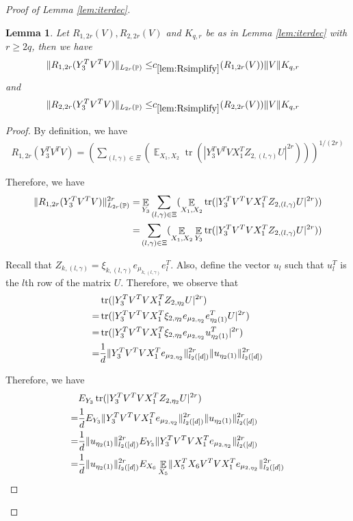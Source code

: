 \documentclass[11pt]{amsart}
\numberwithin{equation}{section}
\numberwithin{equation}{section}
\DeclareMathOperator{\E}{\mathbb{E}}
\DeclareMathOperator{\Pb}{\mathbb{P}}
\DeclareMathOperator*{\tr}{tr}
\DeclarePairedDelimiter{\norm}{\lVert}{\rVert}
\newtheorem{lemma}[theorem]{Lemma}
\begin{document}
\begin{proof}[Proof of Lemma \ref{lem:iterdec}]
\begin{lemma}\label{lem:Rsimplify}
Let $R_{1,2r}(V), R_{2,2r}(V)$ and $K_{q,r}$ be as in Lemma \ref{lem:iterdec} with $r \ge2q$, then we have
\begin{align*}
    \norm{R_{1,2r}(Y_3^TV^TV)}_{L_{2r}(\Pb)}  
    \le &c_{\ref{lem:Rsimplify}}(R_{1,2r}(V))\norm{V}K_{q,r}
\end{align*}
and
\begin{align*}
    \norm{R_{2,2r}(Y_3^TV^TV)}_{L_{2r}(\Pb)}  
    \le &c_{\ref{lem:Rsimplify}}(R_{2,2r}(V))\norm{V}K_{q,r}
\end{align*}
\end{lemma}

\begin{proof}
By definition, we have
\begin{align*}
    R_{1,2r}(Y_3^TV^TV)=(\sum\limits_{(l,\gamma) \in \Xi}(\E_{X_1,X_2} \tr(|Y_3^TV^TVX_1^TZ_{2,(l,\gamma)}U|^{2r})))^{1/(2r)}
\end{align*}

Therefore, we have
\begin{align*}
    \norm{R_{1,2r}(Y_3^TV^TV)}_{L_{2r}(\Pb)}^{2r}  
    = & \E_{Y_3} \sum\limits_{(l,\gamma) \in \Xi}(\E_{X_1,X_2} \tr(|Y_3^TV^TVX_1^TZ_{2,(l,\gamma)}U|^{2r}))
    \\= &  \sum\limits_{(l,\gamma) \in \Xi}(\E_{X_1,X_2} \E_{Y_3}\tr(|Y_3^TV^TVX_1^TZ_{2,(l,\gamma)}U|^{2r}))
\end{align*}





Recall that $Z_{k,(l,\gamma)}=\xi_{k,(l,\gamma)}e_{\mu_{k,(l,\gamma)}}e_l^T$. Also, define the vector $u_l$ such that $u_l^T$ is the $l$th row of the matrix $U$. Therefore, we observe that
\begin{align*}
    &\tr(|Y_3^TV^TVX_1^TZ_{2,\eta_2}U|^{2r})
\\=&\tr(|Y_3^TV^TVX_1^T\xi_{2,\eta_2}e_{\mu_{2,\eta_2}}e_{\eta_2(1)}^TU|^{2r})
\\=&\tr(|Y_3^TV^TVX_1^T\xi_{2,\eta_2}e_{\mu_{2,\eta_2}}u_{\eta_2(1)}^T|^{2r})
\\=&\frac 1 d\norm{Y_3^TV^TVX_1^Te_{\mu_{2,\eta_2}}}_{l_2([d])}^{2r}\norm{u_{\eta_2(1)}}_{l_2([d])}^{2r}
\end{align*}

Therefore, we have
\begin{align*}
    &E_{Y_3}\tr(|Y_3^TV^TVX_1^TZ_{2,\eta_2}U|^{2r})
\\=&\frac 1 dE_{Y_3}\norm{Y_3^TV^TVX_1^Te_{\mu_{2,\eta_2}}}_{l_2([d])}^{2r}\norm{u_{\eta_2(1)}}_{l_2([d])}^{2r}
\\=&\frac 1 d\norm{u_{\eta_2(1)}}_{l_2([d])}^{2r}E_{Y_3}\norm{Y_3^TV^TVX_1^Te_{\mu_{2,\eta_2}}}_{l_2([d])}^{2r}\\=&\frac 1 d\norm{u_{\eta_2(1)}}_{l_2([d])}^{2r}E_{X_6}\E_{X_5}\norm{X_5^TX_6V^TVX_1^Te_{\mu_{2,\eta_2}}}_{l_2([d])}^{2r}
\end{align*}


\end{proof}
\end{proof}
\end{document}
